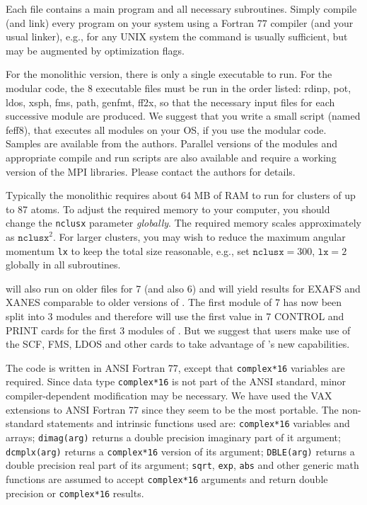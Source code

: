 \documentclass[11pt,oneside]{report} %
\begin{document}
 Each file contains a main program and all necessary
subroutines.  Simply compile (and link) every program on your system
using a Fortran 77 compiler (and your usual linker), e.g., for any
UNIX system the command  is usually
sufficient, but may be augmented by optimization flags.

For the monolithic version, there is only a single executable to run.
For the modular code, the 8  executable files  
must be run in the order listed: rdinp, pot, ldos,
xsph, fms, path, genfmt, ff2x, so that the necessary input files
for each successive module are produced.
We suggest that you write a small script (named feff8),
that executes all modules on your OS, if you use the modular code. 
Samples are available from the authors. Parallel versions of the
modules and appropriate compile and run scripts are also available
and require a working version of the MPI libraries. Please contact
the authors for details.

  Typically the monolithic {\feffcur} requires about 64 MB of RAM to run for
clusters of up to 87 atoms. To adjust the required memory to your
computer, you should change the \texttt{nclusx} parameter {\it globally}.
The required memory scales approximately as $\mathtt{nclusx}^2$.
For larger clusters, you may wish to reduce the maximum angular
momentum \texttt{lx} to keep the total size reasonable, e.g., set
$\mathtt{nclusx}=300$, $\mathtt{lx}=2$ globally in all subroutines.

{\feffcur} will also run on older  files for {\feff}7
(and also {\feff}6) and will yield results for EXAFS and XANES comparable
to older versions of {\feff}.  The first module of {\feff}7 has now
been split into 3 modules and therefore {\feffcur} will use the first
value in {\feff}7 CONTROL and PRINT cards for the first 3 modules of
{\feffcur}.  But we suggest that users make use of the SCF, FMS,
LDOS  and other cards to take advantage of {\feffcur}'s new capabilities.

The {\feff} code is written in ANSI Fortran 77, except that
\texttt{complex*16} variables are required.  Since data type
\texttt{complex*16} is not part of the ANSI standard, minor
compiler-dependent modification may be necessary.  We have used the
VAX extensions to ANSI Fortran 77 since they seem to be the most
portable.  The non-standard statements and intrinsic functions used
are: \texttt{complex*16} variables and arrays; \texttt{dimag(arg)}
returns a double precision imaginary part of it argument;
\texttt{dcmplx(arg)} returns a \texttt{complex*16} version of its
argument; \texttt{DBLE(arg)} returns a double precision real part of
its argument; \texttt{sqrt}, \texttt{exp}, \texttt{abs} and other
generic math functions are assumed to accept \texttt{complex*16}
arguments and return double precision or \texttt{complex*16} results.
\end{document}
